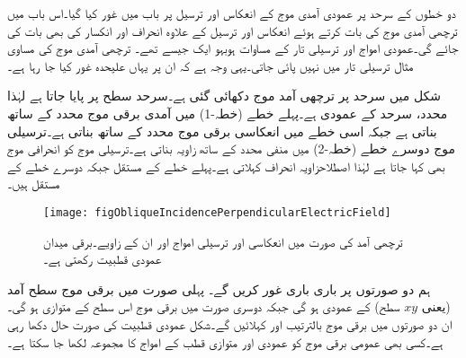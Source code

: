 دو خطوں کے سرحد پر عمودی آمدی موج کے انعکاس اور ترسیل پر باب  میں غور کیا گیا۔اس باب میں ترچھی آمدی موج کی بات کرتے ہوئے انعکاس اور ترسیل کے علاوہ انحراف اور انکسار کی بھی بات کی جائے گی۔عمودی امواج اور ترسیلی تار کے مساوات ہوبہو ایک جیسے تھے۔ ترچھی آمدی موج کی مساوی مثال ترسیلی تار میں نہیں پائی جاتی۔یہی وجہ ہے کہ ان پر یہاں علیحدہ  غور کیا جا رہا ہے۔

شکل  میں سرحد پر ترچھی آمد موج دکھائی گئی ہے۔سرحد  سطح پر پایا جاتا ہے لہٰذا  محدد، سرحد کے عمودی ہے۔پہلے خطے (خطہ-1) میں آمدی برقی موج  محدد کے ساتھ   بناتی ہے جبکہ اسی خطے میں انعکاسی برقی موج  محدد کے ساتھ   بناتی ہے۔ترسیلی موج دوسرے خطے (خطہ-2) میں منفی  محدد کے ساتھ  زاویہ بناتی ہے۔ترسیلی موج کو انحرافی موج بھی کہا جاتا ہے لہٰذا  اصطلاح{زاویہ انحراف} کہلاتی ہے۔پہلے خطے کے مستقل  جبکہ دوسرے خطے کے مستقل  ہیں۔
\begin{figure}
\centering
\texttt{[image: figObliqueIncidencePerpendicularElectricField]}
\caption{ترچھی آمد کی صورت میں انعکاسی اور ترسیلی امواج اور ان کے زاویے۔برقی میدان عمودی قطبیت رکھتی ہے۔}
\label{شکل_ترچھی_آمد_متوازی_برقی_میدان_عمومی_شکل}
\end{figure}

ہم دو صورتوں پر باری باری غور کریں گے۔ پہلی صورت میں برقی موج سطح آمد (یعنی $xy$ سطح) کے  عمودی ہو گی جبکہ دوسری صورت میں برقی موج اس سطح کے متوازی ہو گی۔ان دو صورتوں میں برقی موج بالترتیب  اور  کہلائیں گے۔شکل  عمودی قطبیت کی صورت حال دکھا رہی ہے۔کسی بھی عمومی برقی موج کو عمودی اور متوازی قطب کے امواج کا مجموعہ لکھا جا سکتا ہے۔

